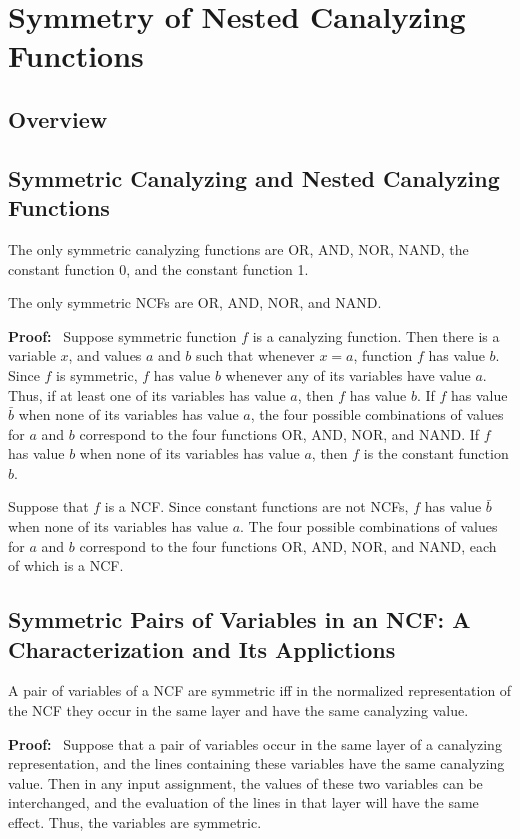 \section{Symmetry of Nested Canalyzing Functions}
\label{sse:ncf_and_symmetry}

\subsection{Overview}
\label{sse:res_overview}


\subsection{Symmetric Canalyzing and Nested Canalyzing Functions}
\label{sse:sym_and_cf_ncf}

\begin{theorem}\label{thm:ncf_symmetric}
The only symmetric canalyzing functions are OR, AND, NOR, NAND, 
the constant function 0, and the constant function 1.

The only symmetric NCFs are OR, AND, NOR, and NAND.
\end{theorem}
\noindent
\textbf{Proof:}~
Suppose symmetric function $f$ is a canalyzing function. Then there
is a variable $x$, and values $a$ and $b$ such that whenever $x =
a$, function $f$ has value $b$.  Since $f$ is symmetric, $f$  has
value $b$ whenever any of its variables have value $a$.  Thus, if
at least one of its variables has value $a$, then $f$ has value
$b$.  If $f$ has value $\bar{b}$ when none of its variables has
value $a$, the four possible combinations of values for $a$ and $b$
correspond to the four functions OR, AND, NOR, and NAND.  If $f$
has value $b$ when none of its variables has value $a$, then $f$
is the constant function $b$.

Suppose that $f$ is a NCF.  Since constant functions are not NCFs,
$f$ has value $\bar{b}$ when none of its variables has value $a$.
The four possible combinations of values for $a$ and $b$ correspond
to the four functions OR, AND, NOR, and NAND, each of which is a
NCF.  \QED

\subsection{Symmetric Pairs of Variables in an NCF: A Characterization
and Its Applictions}
\label{sse:ncf_strong_sym}

\begin{theorem}\label{thm:ncf_symmetric_variables}
A pair of variables of a NCF are symmetric iff
in the normalized representation of the NCF
they occur in the same layer and have the same canalyzing value.
\end{theorem}
\noindent
\textbf{Proof:}~
Suppose that a pair of variables occur in the same layer of a
canalyzing representation, and the lines containing these variables
have the same canalyzing value.  Then in any input assignment, the
values of these two variables can be interchanged, and the evaluation
of the lines in that layer will have the same effect.  Thus, the
variables are symmetric.

